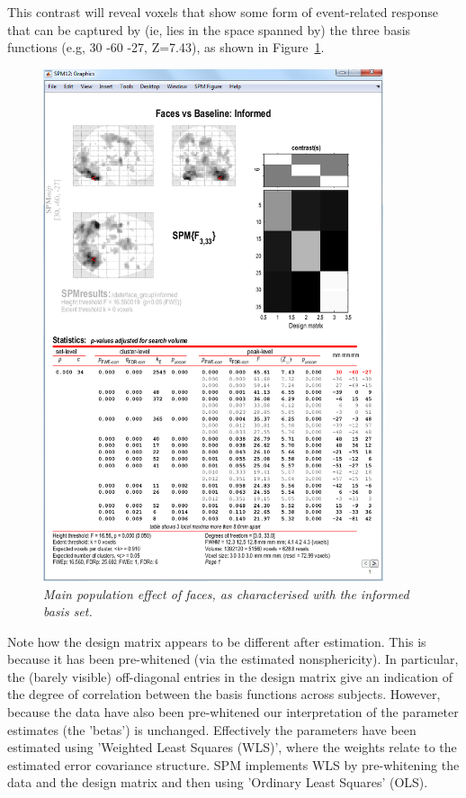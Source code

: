 \documentclass[a4paper,titlepage]{book}
\begin{document}
This contrast will reveal voxels that show some form of event-related response that can be captured by (ie, lies in the space spanned by) the three basis functions (e.g, 30 -60 -27, Z=7.43), as shown in Figure~\ref{informed_results}.
\begin{figure}
\begin{center}
\includegraphics[width=100mm]{faces_group/informed_results}
\caption{\em Main population effect of faces, as characterised with the informed basis set. \label{informed_results}}
\end{center}
\end{figure}

Note how the design matrix appears to be different after estimation. This is because it has been pre-whitened (via the estimated nonsphericity). In particular, the (barely visible) off-diagonal entries in the design matrix give an indication of the degree of correlation between the basis functions across subjects. However, because the data have also been pre-whitened our interpretation of the parameter estimates (the 'betas') is unchanged. Effectively the parameters have been estimated using 'Weighted Least Squares (WLS)', where the weights relate to the estimated error covariance structure. SPM implements WLS by pre-whitening the data and the design matrix and then using 'Ordinary Least Squares' (OLS).
\end{document}
